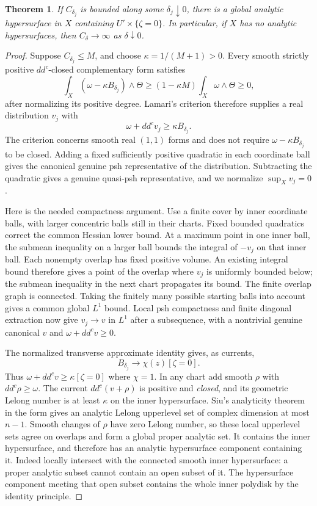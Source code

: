\documentclass[11pt]{article}
\newtheorem{theorem}{Theorem}
\theoremstyle{remark}\newtheorem{remark}{Remark}
\newcommand{\ddc}{dd^c}
\begin{document}
\begin{theorem}\label{thm:concentration}
If $C_{\delta_j}$ is bounded along some $\delta_j\downarrow0$, there
is a global analytic hypersurface in $X$ containing
$U'\times\{\zeta=0\}$. In particular, if $X$ has no analytic
hypersurfaces, then $C_\delta\to\infty$ as $\delta\downarrow0$.
\end{theorem}
\begin{proof}
Suppose $C_{\delta_j}\leq M$, and choose $\kappa=1/(M+1)>0$.
Every smooth strictly positive $\ddc$-closed complementary form satisfies
\[
 \int_X(\omega-\kappa B_{\delta_j})\wedge\Theta
       \geq(1-\kappa M)\int_X\omega\wedge\Theta\geq0,
\]
after normalizing its positive degree. Lamari's criterion
\cite[Lemma 3.3]{Lamari} therefore supplies a real distribution $v_j$
with
\[
 \omega+\ddc v_j\geq\kappa B_{\delta_j}.
\]
The criterion concerns smooth real $(1,1)$ forms and does not require
$\omega-\kappa B_{\delta_j}$ to be closed. Adding a fixed sufficiently
positive quadratic in each coordinate ball gives the canonical genuine
psh representative of the distribution. Subtracting the quadratic gives
a genuine quasi-psh representative, and we normalize $\sup_Xv_j=0$.

Here is the needed compactness argument. Use a finite cover by inner
coordinate balls, with larger concentric balls still in their charts.
Fixed bounded quadratics correct the common Hessian lower bound. At a
maximum point in one inner ball, the submean inequality on a larger ball
bounds the integral of $-v_j$ on that inner ball. Each nonempty overlap
has fixed positive volume. An existing integral bound therefore gives a
point of the overlap where $v_j$ is uniformly bounded below; the submean
inequality in the next chart propagates its bound. The finite overlap
graph is connected. Taking the finitely many possible starting balls
into account gives a common global $L^1$ bound. Local psh compactness
\cite[I.5.8--5.9]{Demailly} and finite diagonal extraction now give
$v_j\to v$ in $L^1$ after a subsequence, with a nontrivial genuine
canonical $v$ and $\omega+\ddc v\geq0$.

The normalized transverse approximate identity gives, as currents,
\[
 B_{\delta_j}\longrightarrow\chi(z)[\zeta=0].
\]
Thus $\omega+\ddc v\geq\kappa[\zeta=0]$ where $\chi=1$.
In any chart add smooth $\rho$ with $\ddc\rho\geq\omega$.
The current $\ddc(v+\rho)$ is positive and \emph{closed}, and its
geometric Lelong number is at least $\kappa$ on the inner hypersurface.
Siu's analyticity theorem in the form
\cite[III.8.5]{Demailly} gives an analytic Lelong upperlevel set of
complex dimension at most $n-1$. Smooth changes of $\rho$ have zero
Lelong number, so these local upperlevel sets agree on overlaps and
form a global proper analytic set. It contains the inner hypersurface,
and therefore has an analytic hypersurface component containing it.
Indeed locally intersect with the connected smooth inner hypersurface:
a proper analytic subset cannot contain an open subset of it. The
hypersurface component meeting that open subset contains the whole inner
polydisk by the identity principle.


\end{proof}
\end{document}
